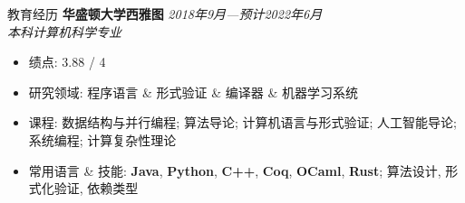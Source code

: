 \documentclass{resume}
\begin{document}
	\begin{rSection}{教育经历}
	{\bf 华盛顿大学西雅图} \hfill {\em 2018年9月---预计2022年6月} \\
	\textit{本科计算机科学专业}
	\vspace{-5pt}
        \begin{itemize}[leftmargin=*]
            \setlength{\itemsep}{1pt}
            \setlength{\parskip}{0pt}
			\setlength{\parsep}{0pt}
			\item 绩点: 3.88 / 4
            \item 研究领域: 程序语言 \& 形式验证 \& 编译器 \& 机器学习系统
            \item 课程: 数据结构与并行编程; 算法导论; 计算机语言与形式验证; 人工智能导论; 系统编程; 计算复杂性理论
			\item 常用语言 \& 技能: \textbf{Java}, \textbf{Python}, \textbf{C++}, \textbf{Coq}, \textbf{OCaml}, \textbf{Rust}; 算法设计, 形式化验证, 依赖类型
		\end{itemize}
	\end{rSection}
	\vspace{-5pt}

\end{document}

